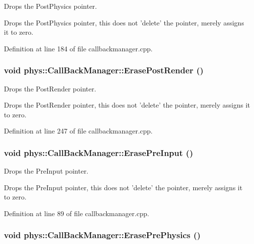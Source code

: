 Drops the PostPhysics pointer. 

Drops the PostPhysics pointer, this does not 'delete' the pointer, merely assigns it to zero. 

Definition at line 184 of file callbackmanager.cpp.

\hypertarget{classphys_1_1CallBackManager_a0eef22a8df4dc87289a18f0e6a1d0baf}{
\subsubsection[{ErasePostRender}]{\setlength{\rightskip}{0pt plus 5cm}void phys::CallBackManager::ErasePostRender ()}}
\label{d1/d47/classphys_1_1CallBackManager_a0eef22a8df4dc87289a18f0e6a1d0baf}


Drops the PostRender pointer. 

Drops the PostRender pointer, this does not 'delete' the pointer, merely assigns it to zero. 

Definition at line 247 of file callbackmanager.cpp.

\hypertarget{classphys_1_1CallBackManager_ae3da6f1eb10cdf4d8551aaeeda73053c}{
\subsubsection[{ErasePreInput}]{\setlength{\rightskip}{0pt plus 5cm}void phys::CallBackManager::ErasePreInput ()}}
\label{d1/d47/classphys_1_1CallBackManager_ae3da6f1eb10cdf4d8551aaeeda73053c}


Drops the PreInput pointer. 

Drops the PreInput pointer, this does not 'delete' the pointer, merely assigns it to zero. 

Definition at line 89 of file callbackmanager.cpp.

\hypertarget{classphys_1_1CallBackManager_afaeba4d6ae245d1560b76799417cce40}{
\subsubsection[{ErasePrePhysics}]{\setlength{\rightskip}{0pt plus 5cm}void phys::CallBackManager::ErasePrePhysics ()}}
\label{d1/d47/classphys_1_1CallBackManager_afaeba4d6ae245d1560b76799417cce40}


